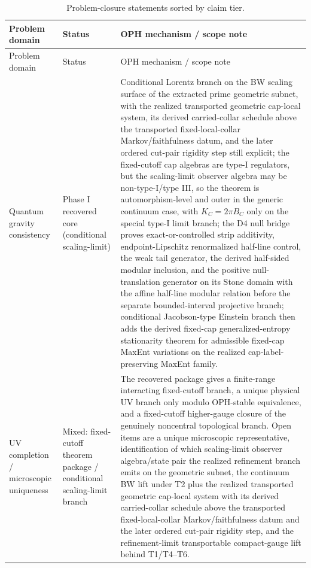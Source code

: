 \begin{longtable}{p{} p{} p{}}
\caption{Problem-closure statements sorted by claim tier.}\label{tab:additional-closures}\\
\toprule
Problem domain & Status & OPH mechanism / scope note \\
\midrule
\endfirsthead
\toprule
Problem domain & Status & OPH mechanism / scope note \\
\midrule
\endhead
\bottomrule
\endfoot
Quantum gravity consistency & Phase I recovered core (conditional scaling-limit) & Conditional Lorentz branch on the BW scaling surface of the extracted prime geometric subnet, with the realized transported geometric cap-local system, its derived carried-collar schedule above the transported fixed-local-collar Markov/faithfulness datum, and the later ordered cut-pair rigidity step still explicit; the fixed-cutoff cap algebras are type-I regulators, but the scaling-limit observer algebra may be non-type-I/type III, so the theorem is automorphism-level and outer in the generic continuum case, with \(K_C=2\pi B_C\) only on the special type-I limit branch; the D4 null bridge proves exact-or-controlled strip additivity, endpoint-Lipschitz renormalized half-line control, the weak tail generator, the derived half-sided modular inclusion, and the positive null-translation generator on its Stone domain with the affine half-line modular relation before the separate bounded-interval projective branch; conditional Jacobson-type Einstein branch then adds the derived fixed-cap generalized-entropy stationarity theorem for admissible fixed-cap MaxEnt variations on the realized cap-label-preserving MaxEnt family. \\
UV completion / microscopic uniqueness & Mixed: fixed-cutoff theorem package / conditional scaling-limit branch & The recovered package gives a finite-range interacting fixed-cutoff branch, a unique physical UV branch only modulo OPH-stable equivalence, and a fixed-cutoff higher-gauge closure of the genuinely noncentral topological branch. Open items are a unique microscopic representative, identification of which scaling-limit observer algebra/state pair the realized refinement branch emits on the geometric subnet, the continuum BW lift under T2 plus the realized transported geometric cap-local system with its derived carried-collar schedule above the transported fixed-local-collar Markov/faithfulness datum and the later ordered cut-pair rigidity step, and the refinement-limit transportable compact-gauge lift behind T1/T4--T6. \\

\end{longtable}
